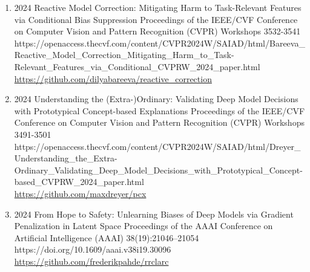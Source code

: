 {\begin{enumerate}
        \item {}
                            {2024}
                            {Reactive Model Correction: Mitigating Harm to Task-Relevant Features via Conditional Bias Suppression}
                            {Proceedings of the IEEE/CVF Conference on Computer Vision and Pattern Recognition (CVPR) Workshops}
                            {3532-3541}
                            {https://openaccess.thecvf.com/content/CVPR2024W/SAIAD/html/Bareeva_Reactive_Model_Correction_Mitigating_Harm_to_Task-Relevant_Features_via_Conditional_CVPRW_2024_paper.html}
                            {\\\href{https://github.com/dilyabareeva/reactive_correction}{https://github.com/dilyabareeva/reactive\_correction}}                           

        \item {}
                            {2024}
                            {Understanding the (Extra-)Ordinary: Validating Deep Model Decisions with
                            Prototypical Concept-based Explanations}
                            {Proceedings of the IEEE/CVF Conference on Computer Vision and Pattern Recognition (CVPR) Workshops}
                            {3491-3501}
                            {https://openaccess.thecvf.com/content/CVPR2024W/SAIAD/html/Dreyer_Understanding_the_Extra-Ordinary_Validating_Deep_Model_Decisions_with_Prototypical_Concept-based_CVPRW_2024_paper.html}
                            {\\\href{https://github.com/maxdreyer/pcx}{https://github.com/maxdreyer/pcx}}                                    

        \item {}
                            {2024}
                            {From Hope to Safety: Unlearning Biases of Deep Models via Gradient Penalization in Latent Space}
                            {Proceedings of the AAAI Conference on Artificial Intelligence (AAAI)}
                            {38(19):21046--21054}
                            {https://doi.org/10.1609/aaai.v38i19.30096}
                            {\\\href{https://github.com/frederikpahde/rrclarc}{https://github.com/frederikpahde/rrclarc}}


\end{enumerate}}
